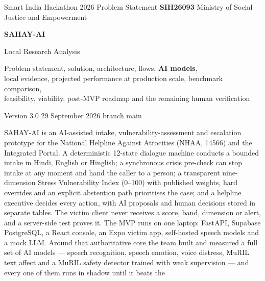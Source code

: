 \documentclass[11pt,a4paper]{article}
\newcommand{\codeus}{\textunderscore\allowbreak}
\DeclareRobustCommand{\code}[1]{{\ttfamily\let\_\codeus #1}}
\begin{document}

\begin{titlepage}
\centering
{\small\color{sahaygray} Smart India Hackathon 2026 \textbullet{} Problem Statement \textbf{SIH26093} \textbullet{} Ministry of Social Justice and Empowerment\par}
\vspace{2.0cm}
{\fontsize{34}{40}\selectfont\bfseries\color{sahayblue} SAHAY-AI\par}
\vspace{0.45cm}
{\LARGE Local Research Analysis\par}
\vspace{0.25cm}
{\large Problem statement, solution, architecture, flows, \textbf{AI models},\\[2pt]
local evidence, projected performance at production scale, benchmark comparison,\\[2pt]
feasibility, viability, post-MVP roadmap and the remaining human verification\par}
\vspace{0.9cm}
{\large Version 3.0 \textbullet{} 29 September 2026 \textbullet{} branch \code{main}\par}
\vspace{1.3cm}
\begin{keybox}[title={The one-paragraph version}]
\small
SAHAY-AI is an AI-assisted intake, vulnerability-assessment and escalation prototype for the
National Helpline Against Atrocities (NHAA, 14566) and the Integrated Portal. A deterministic
12-state dialogue machine conducts a bounded intake in Hindi, English or Hinglish; a synchronous
crisis pre-check can stop intake at any moment and hand the caller to a person; a transparent
nine-dimension Stress Vulnerability Index (0--100) with published weights, hard overrides and an
explicit abstention path prioritises the case; and a helpline executive decides every action, with
AI proposals and human decisions stored in separate tables. The victim client never receives a
score, band, dimension or alert, and a server-side test proves it. The MVP runs on one laptop:
FastAPI, Supabase PostgreSQL, a React console, an Expo victim app, self-hosted speech models and a
mock LLM. Around that authoritative core the team built and measured a full set of AI models ---
speech recognition, speech emotion, voice distress, MuRIL text affect and a MuRIL safety detector
trained with weak supervision --- and every one of them runs in shadow until it beats the

\end{keybox}
\end{titlepage}
\end{document}
